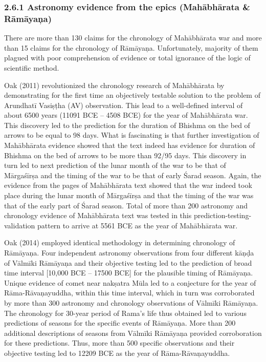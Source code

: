 \subsubsection{2.6.1 Astronomy evidence from the epics (Mahābhārata \& Rāmāyaņa)}

There are more than 130 claims for the chronology of Mahābhārata war and more than 15 claims for the chronology of Rāmāyaņa. Unfortunately, majority of them plagued with poor comprehension of evidence or total ignorance of the logic of scientific method.

Oak (2011) revolutionized the chronology research of Mahābhārata by demonstrating for the first time an objectively testable solution to the problem of Arundhatī Vasiṣṭha (AV) observation. This lead to a well-defined interval of about 6500 years (11091 BCE – 4508 BCE) for the year of Mahābhārata war. This discovery led to the prediction for the duration of Bhishma on the bed of arrows to be equal to 98 days. What is fascinating is that further investigation of Mahābhārata evidence showed that the text indeed has evidence for duration of Bhishma on the bed of arrows to be more than 92/95 days. This discovery in turn led to next prediction of the lunar month of the war to be that of Mārgaśīrṣa and the timing of the war to be that of early Śarad season. Again, the evidence from the pages of Mahābhārata text showed that the war indeed took place during the lunar month of Mārgaśīrṣa and that the timing of the war was that of the early part of Śarad season. Total of more than 200 astronomy and chronology evidence of Mahābhārata text was tested in this prediction-testing-validation pattern to arrive at 5561 BCE as the year of Mahābhārata war.

Oak (2014) employed identical methodology in determining chronology of Rāmāyaņa. Four independent astronomy observations from four different kāņḍa of Vālmīki Rāmāyaņa and their objective testing led to the prediction of broad time interval [10,000 BCE – 17500 BCE] for the plausible timing of Rāmāyaņa. Unique evidence of comet near nakṣatra Mūla led to a conjecture for the year of Rāma-Rāvaņayuddha, within this time interval, which in turn was corroborated by more than 300 astronomy and chronology observations of Vālmīki Rāmāyaņa. The chronology for 30-year period of Rama’s life thus obtained led to various predictions of seasons for the specific events of Rāmāyaņa. More than 200 additional descriptions of seasons from Vālmīki Rāmāyaņa provided corroboration for these predictions. Thus, more than 500 specific observations and their objective testing led to 12209 BCE as the year of Rāma-Rāvaņayuddha.

